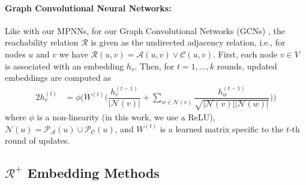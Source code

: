 \documentclass{article}
\begin{document}
\paragraph{Graph Convolutional Neural Networks: } Like with our MPNNs, for our Graph Convolutional Networks (GCNs) \cite{kipf2016semi}, the reachability relation $\mathcal{R}$ is given as the undirected adjacency relation, i.e., for nodes $u$ and $v$ we have $\mathcal{R}(u, v) = \mathcal{A}(u, v) \vee \mathcal{C}(u, v)$. First, each node $v \in V$ is associated with an embedding $h_v$. Then, for $t = 1, \ldots, k$ rounds, updated embeddings are computed as
\begin{alignat*}{2}
h_{v}^{(t)} &= \phi \big( W^{(t)} \big( \dfrac{h_v^{(t - 1)}}{|\mathcal{N}(v)|} + \sum_{w \in \mathcal{N}(v)} \dfrac{h_{w}^{(t - 1)}}{\sqrt{|\mathcal{N}(v)||\mathcal{N}(w)|}} \big) \big)
\end{alignat*}
where $\phi$ is a non-linearity (in this work, we use a ReLU), $\mathcal{N}(u) = \mathcal{P}_{\mathcal{A}}(u) \cup \mathcal{P}_{\mathcal{C}}(u)$, and $W^{(t)}$ is a learned matrix specific to the $t$-th round of updates.

\subsection{$\mathcal{R}^{+}$ Embedding Methods}
\label{sec:global_embedders}
\end{document}
